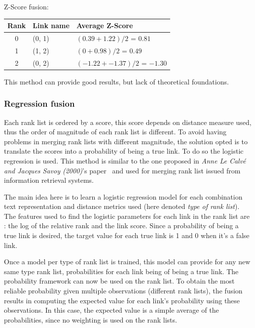 Z-Score fusion:

\begin{tabular}{c l l}
  \toprule
  Rank & Link name & Average Z-Score \\
  \midrule
  0 & (0, 1) & $(0.39 + 1.22) / 2$ = $0.81$ \\
  1 & (1, 2) & $(0 + 0.98) / 2$ = $0.49$ \\
  2 & (0, 2) & $(-1.22 + -1.37) / 2$ = $-1.30$ \\
  \bottomrule
\end{tabular}

This method can provide good results, but lack of theoretical foundations.

\subsubsection{Regression fusion \label{sec:regression_fusion}}

Each rank list is ordered by a score, this score depends on distance measure used, thus the order of magnitude of each rank list is different.
To avoid having problems in merging rank lists with different magnitude, the solution opted is to translate the scores into a probability of being a true link.
To do so the logistic regression is used.
This method is similar to the one proposed in \textit{Anne Le Calvé and Jacques Savoy (2000)}'s paper~\cite{le_calve_database_merging} and used for merging rank list issued from information retrieval systems.

The main idea here is to learn a logistic regression model for each combination text representation and distance metrics used (here denoted \textit{type of rank list}).
The features used to find the logistic parameters for each link in the rank list are : the log of the relative rank and the link score.
Since a probability of being a true link is desired, the target value for each true link is 1 and 0 when it's a false link.

Once a model per type of rank list is trained, this model can provide for any new same type rank list, probabilities for each link being of being a true link.
The probability framework can now be used on the rank list.
To obtain the most reliable probability given multiple observations (different rank lists), the fusion results in computing the expected value for each link's probability using these observations.
In this case, the expected value is a simple average of the probabilities, since no weighting is used on the rank lists.

